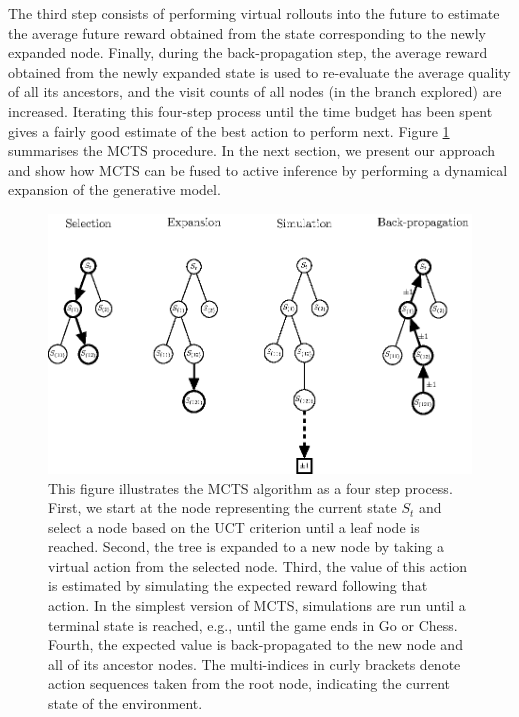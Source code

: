 \documentclass[twoside,11pt]{article}
\begin{document}
The third step consists of performing virtual rollouts into the future to estimate the average future reward obtained from the state corresponding to the newly expanded node. Finally, during the back-propagation step, the average reward obtained from the newly expanded state is used to re-evaluate the average quality of all its ancestors, and the visit counts of all nodes (in the branch explored) are increased. Iterating this four-step process until the time budget has been spent gives a fairly good estimate of the best action to perform next. Figure \ref{fig:MCTS} summarises the MCTS procedure. In the next section, we present our approach and show how MCTS can be fused to active inference by performing a dynamical expansion of the generative model.

\begin{figure}[H]
	\begin{center}
	\includegraphics[scale=1]{BTAI-figure5}
	\end{center}
\vspace{-0.25cm}
    \caption{
This figure illustrates the MCTS algorithm as a four step process. First, we start at the node representing the current state $S_t$ and select a node based on the UCT criterion until a leaf node is reached. Second, the tree is expanded to a new node by taking a virtual action from the selected node. Third, the value of this action is estimated by simulating the expected reward following that action. In the simplest version of MCTS, simulations are run until a terminal state is reached, e.g., until the game ends in Go or Chess. Fourth, the expected value is back-propagated to the new node and all of its ancestor nodes. The multi-indices in curly brackets denote action sequences taken from the root node, indicating the current state of the environment.}
    \label{fig:MCTS}
\end{figure}
\end{document}
